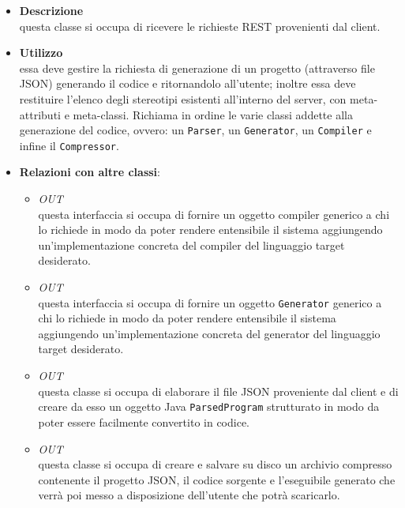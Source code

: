 \begin{itemize}
\item \textbf{Descrizione}\\
questa classe si occupa di ricevere le richieste REST provenienti dal client.
\item \textbf{Utilizzo}\\
essa deve gestire la richiesta di generazione di un progetto (attraverso file JSON) generando il codice e ritornandolo all'utente; inoltre essa deve restituire l'elenco degli stereotipi esistenti all'interno del server, con meta-attributi e meta-classi.
Richiama in ordine le varie classi addette alla generazione del codice, ovvero: un \texttt{Parser}, un \texttt{Generator}, un \texttt{Compiler} e infine il \texttt{Compressor}. 
\item \textbf{Relazioni con altre classi}:
\begin{itemize}
\item \textit{OUT} \hyperref[\nogloxy{swedesigner::server::compiler::Compiler}]{}\\
questa interfaccia si occupa di fornire un oggetto compiler generico a chi lo richiede in modo da poter rendere entensibile il sistema aggiungendo un'implementazione concreta del compiler del linguaggio target desiderato.
\item \textit{OUT} \hyperref[\nogloxy{swedesigner::server::generator::Generator}]{}\\
questa interfaccia si occupa di fornire un oggetto \texttt{Generator} generico a chi lo richiede in modo da poter rendere entensibile il sistema aggiungendo un'implementazione concreta del generator del linguaggio target desiderato.
\item \textit{OUT} \hyperref[\nogloxy{swedesigner::server::parser::Parser}]{}\\
questa classe si occupa di elaborare il file JSON proveniente dal client e di creare da esso un oggetto Java \texttt{ParsedProgram} strutturato in modo da poter essere facilmente convertito in codice.
\item \textit{OUT} \hyperref[\nogloxy{swedesigner::server::utility::Compressor}]{}\\
questa classe si occupa di creare e salvare su disco un archivio compresso contenente il progetto JSON, il codice sorgente e l'eseguibile generato che verrà poi messo a disposizione dell'utente che potrà scaricarlo.
\end{itemize}

\end{itemize}

